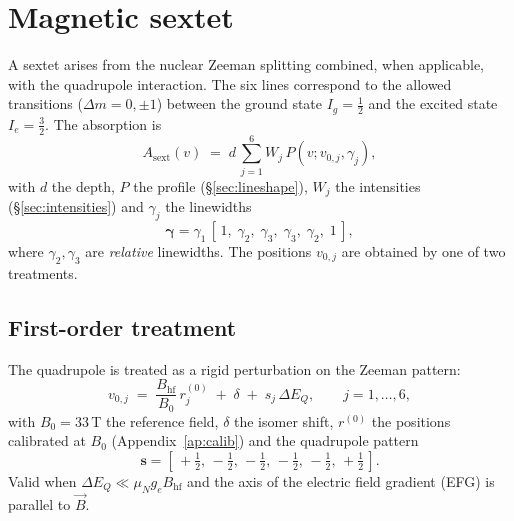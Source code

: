\documentclass[11pt,a4paper]{article}
\newcommand{\BHF}{B_{\mathrm{hf}}}
\newcommand{\dEQ}{\Delta E_{Q}}
\begin{document}
\section{Magnetic sextet}\label{sec:sextet}

A sextet arises from the nuclear Zeeman splitting combined, when applicable, with the
quadrupole interaction. The six lines correspond to the
allowed transitions ($\Delta m=0,\pm1$) between the ground state $I_g=\tfrac12$ and the
excited state $I_e=\tfrac32$. The absorption is
\begin{equation}
  A_{\text{sext}}(v) \;=\; d\,\sum_{j=1}^{6} W_j\, P\!\left(v;v_{0,j},\gamma_j\right),
  \label{eq:Asext}
\end{equation}
with $d$ the depth, $P$ the profile (\S\ref{sec:lineshape}), $W_j$ the
intensities (\S\ref{sec:intensities}) and $\gamma_j$ the linewidths
\begin{equation}
  \bm\gamma = \gamma_1\,[\,1,\;\gamma_2,\;\gamma_3,\;\gamma_3,\;\gamma_2,\;1\,],
\end{equation}
where $\gamma_2,\gamma_3$ are \emph{relative} linewidths. The positions
$v_{0,j}$ are obtained by one of two treatments.

\subsection{First-order treatment}
The quadrupole is treated as a rigid perturbation on the Zeeman pattern:
\begin{equation}
  v_{0,j} \;=\; \frac{\BHF}{B_0}\,r_j^{(0)} \;+\; \delta \;+\; s_j\,\dEQ,
  \qquad j=1,\dots,6,
  \label{eq:sext_pos1}
\end{equation}
with $B_0=33\,$T the reference field, $\delta$ the isomer shift,
$r^{(0)}$ the positions calibrated at $B_0$ (Appendix~\ref{ap:calib}) and the
quadrupole pattern
\begin{equation}
  \bm s = \left[\,+\tfrac12,\,-\tfrac12,\,-\tfrac12,\,-\tfrac12,\,-\tfrac12,\,+\tfrac12\,\right].
\end{equation}
Valid when $\dEQ \ll \mu_N g_e \BHF$ and the axis of the electric field gradient
(EFG) is parallel to $\vec B$.
\end{document}

